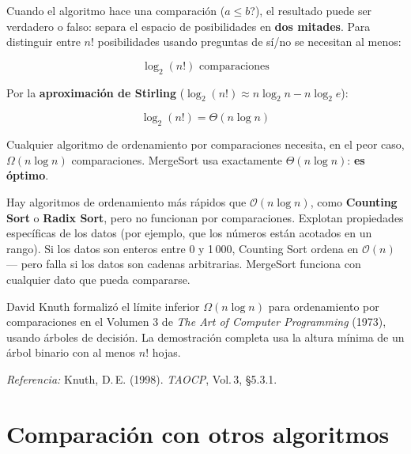 \documentclass[12pt, oneside]{article}
\begin{document}
Cuando el algoritmo hace una comparación ($a \leq b$?), el resultado puede ser
verdadero o falso: separa el espacio de posibilidades en \textbf{dos mitades}.
Para distinguir entre $n!$ posibilidades usando preguntas de sí/no se necesitan
al menos:

\[
  \log_2(n!) \text{ comparaciones}
\]

Por la \textbf{aproximación de Stirling} ($\log_2(n!) \approx n \log_2 n - n
\log_2 e$):

\[
  \log_2(n!) = \Theta(n \log n)
\]

Cualquier algoritmo de ordenamiento por comparaciones necesita, en el peor caso,
$\Omega(n \log n)$ comparaciones. MergeSort usa exactamente $\Theta(n \log n)$:
\textbf{es óptimo}.

\begin{consejo}
  Hay algoritmos de ordenamiento más rápidos que \(\mathcal{O}(n \log n)\), como
  \textbf{Counting Sort} o \textbf{Radix Sort}, pero no funcionan por comparaciones.
  Explotan propiedades específicas de los datos (por ejemplo, que los números están
  acotados en un rango). Si los datos son enteros entre 0 y 1\,000, Counting Sort
  ordena en $\mathcal{O}(n)$ — pero falla si los datos son cadenas arbitrarias.
  MergeSort funciona con cualquier dato que pueda compararse.
\end{consejo}

\begin{tecnico}
  David Knuth formalizó el límite inferior $\Omega(n \log n)$ para ordenamiento
  por comparaciones en el Volumen 3 de \textit{The Art of Computer Programming}
  (1973), usando árboles de decisión. La demostración completa usa la altura mínima
  de un árbol binario con al menos $n!$ hojas.
  \par\smallskip
  \textit{Referencia:} Knuth, D.\,E. (1998). \textit{TAOCP}, Vol.\,3, \S5.3.1.
\end{tecnico}

\section{Comparación con otros algoritmos}
\end{document}
